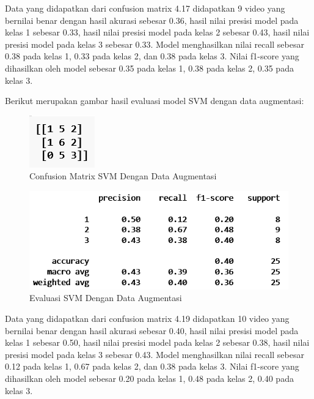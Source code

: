 Data yang didapatkan dari confusion matrix 4.17 didapatkan 9 video yang bernilai benar
dengan hasil akurasi sebesar 0.36, hasil nilai presisi model pada kelas 1 sebesar 0.33, hasil
nilai presisi model pada kelas 2 sebesar 0.43, hasil nilai presisi model pada kelas 3 sebesar 0.33.
Model menghasilkan nilai recall sebesar 0.38 pada kelas 1, 0.33 pada kelas 2, dan 0.38 pada
kelas 3. Nilai f1-score yang dihasilkan oleh model sebesar 0.35 pada kelas 1, 0.38 pada kelas
2, 0.35 pada kelas 3.

Berikut merupakan gambar hasil evaluasi model SVM dengan data augmentasi:

\newpage
\begin{figure} [ht] \centering
  \includegraphics[scale=2.5]{gambar/CMSVMaug.png}
  \caption{Confusion Matrix SVM Dengan Data Augmentasi}
  \label{fig:CMSVMaug}
\end{figure}

\begin{figure} [ht] \centering
  \includegraphics[scale=0.55]{gambar/scoreSVMaug.png}
  \caption{Evaluasi SVM Dengan Data Augmentasi}
  \label{fig:ScoreSVMaug}
\end{figure}

Data yang didapatkan dari confusion matrix 4.19 didapatkan 10 video yang bernilai benar
dengan hasil akurasi sebesar 0.40, hasil nilai presisi model pada kelas 1 sebesar 0.50, hasil
nilai presisi model pada kelas 2 sebesar 0.38, hasil nilai presisi model pada kelas 3 sebesar 0.43.
Model menghasilkan nilai recall sebesar 0.12 pada kelas 1, 0.67 pada kelas 2, dan 0.38 pada
kelas 3. Nilai f1-score yang dihasilkan oleh model sebesar 0.20 pada kelas 1, 0.48 pada kelas
2, 0.40 pada kelas 3.

